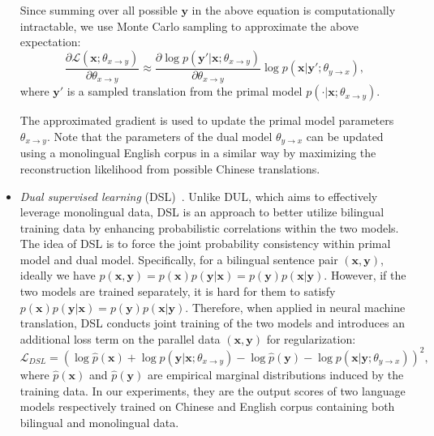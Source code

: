 \documentclass[a4paper]{article}
\begin{document}
\begin{CJK*}{UTF8}{gbsn}
\begin{itemize}
Since summing over all possible $\mathbf{y}$ in the above equation is computationally intractable, we use Monte Carlo sampling to approximate the above expectation:
\begin{equation}
\frac{\partial \mathcal{L}(\mathbf{x};\theta_{x\rightarrow y})}{\partial \theta_{x\rightarrow y}}\approx \frac{\partial \log p(\mathbf{y}'|\mathbf{x};\theta_{x\rightarrow y})}{\partial \theta_{x\rightarrow y}}\log p(\mathbf{x}|\mathbf{y}';\theta_{y\rightarrow x}),
\end{equation} where $\mathbf{y}'$ is a sampled translation from the primal model $p(\cdot|\mathbf{x};\theta_{x\rightarrow y})$. 



The approximated gradient is used to update the primal model parameters $\theta_{x\rightarrow y}$. 
Note that the parameters of the dual model $\theta_{y\rightarrow x}$ can be updated using a monolingual English corpus in a similar way by maximizing the reconstruction likelihood from possible Chinese translations. 

\item \emph{Dual supervised learning} (DSL)~\cite{DSL}. Unlike DUL, which aims to effectively leverage monolingual data, DSL is an approach to better utilize bilingual training data by enhancing probabilistic correlations within the two models. The idea of DSL is to force the joint probability consistency within primal model and dual model. Specifically, for a bilingual sentence pair $(\mathbf{x},\mathbf{y})$, ideally we have $p(\mathbf{x},\mathbf{y})=p(\mathbf{x})p(\mathbf{y}|\mathbf{x})=p(\mathbf{y})p(\mathbf{x}|\mathbf{y})$. However, if the two models are trained separately, it is hard for them to satisfy $p(\mathbf{x})p(\mathbf{y}|\mathbf{x})=p(\mathbf{y})p(\mathbf{x}|\mathbf{y})$. Therefore, when applied in neural machine translation, DSL conducts joint training of the two models and introduces an additional loss term on the parallel data $(\mathbf{x},\mathbf{y})$ for regularization:
\begin{equation}
\mathcal{L}_{DSL}=(\log \hat{p}(\mathbf{x})+\log p(\mathbf{y}|\mathbf{x};\theta_{x\rightarrow y})-\log \hat{p}(\mathbf{y})-\log p(\mathbf{x}|\mathbf{y};\theta_{y\rightarrow x}))^2,
\end{equation}
where $\hat{p}(\mathbf{x})$ and $\hat{p}(\mathbf{y})$ are empirical marginal distributions induced by the training data. In our experiments, they are the output scores of two language models respectively trained on Chinese and English corpus containing both bilingual and monolingual data.
\end{itemize}


\end{CJK*}
\end{document}
